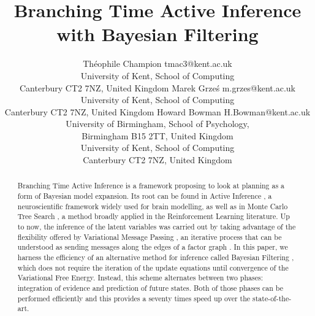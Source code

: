 \documentclass[twoside,11pt]{article}
\begin{document}
\title{Branching Time Active Inference with Bayesian Filtering}

\author{\name Théophile Champion \email tmac3@kent.ac.uk \\
       \addr University of Kent, School of Computing\\
       Canterbury CT2 7NZ, United Kingdom
       \AND
       \name Marek Grze\'s \email m.grzes@kent.ac.uk \\
       \addr University of Kent, School of Computing\\
       Canterbury CT2 7NZ, United Kingdom
       \AND
       \name Howard Bowman \email H.Bowman@kent.ac.uk \\
       \addr University of Birmingham, School of Psychology,\\
       Birmingham B15 2TT, United Kingdom\\
       University of Kent, School of Computing\\
       Canterbury CT2 7NZ, United Kingdom
       }
       

\maketitle

\begin{abstract}%
Branching Time Active Inference \citep{AITS_THEORY,AITS_PRACTICE} is a framework proposing to look at planning as a form of Bayesian model expansion. Its root can be found in Active Inference \citep{FRISTON2016862,AI_TUTO,AI_VMP}, a neuroscientific framework widely used for brain modelling, as well as in Monte Carlo Tree Search \citep{6145622}, a method broadly applied in the Reinforcement Learning literature. Up to now, the inference of the latent variables was carried out by taking advantage of the flexibility offered by Variational Message Passing \citep{VMP_TUTO}, an iterative process that can be understood as sending messages along the edges of a factor graph \citep{FFG_TUTO}. In this paper, we harness the efficiency of an alternative method for inference called Bayesian Filtering \citep{BAYESIAN_FILTERING}, which does not require the iteration of the update equations until convergence of the Variational Free Energy. Instead, this scheme alternates between two phases: integration of evidence and prediction of future states. Both of those phases can be performed efficiently and this provides a seventy times speed up over the state-of-the-art.
\end{abstract}
\end{document}
